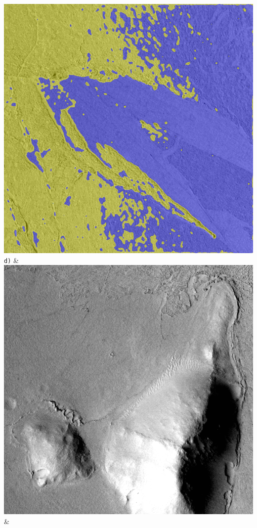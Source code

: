 \begin{table}[h!]
\begin{tabularx}{\textwidth}
		\includegraphics[width=0.9\linewidth]{images/gen/activation_functions/p03_03.png_tanh.png} \\
		\texttt{d)} &
		\includegraphics[width=0.9\linewidth]{images/p03/p03_04.png} &

\end{tabularx}
\end{table}
